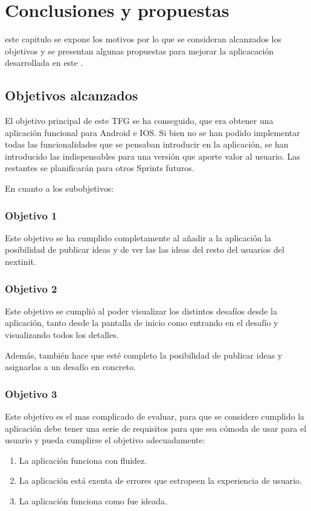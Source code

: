 \chapter{Conclusiones y propuestas}
\label{chap:conclusiones}

 este capitulo se expone los motivos por lo que se consideran alcanzados los objetivos y se presentan algunas propuestas para mejorar la aplicacación desarrollada en este .

\section{Objetivos alcanzados}

El objetivo principal de este TFG se ha conseguido, que era obtener una aplicación funcional para
Android e IOS. Si bien no se han podido implementar todas las funcionalidades que se pensaban introducir 
en la aplicación, se han introducido las indispensables para una versión que aporte valor al usuario. Las
 restantes se planificarán para otros Sprints futuros.

En cuanto a los subobjetivos: 
\subsection{Objetivo 1}
Este objetivo se ha cumplido completamente al añadir a la aplicación la posibilidad
de publicar ideas y de ver las las ideas del resto del usuarios del nextinit.
\subsection{Objetivo 2}
Este objetivo se cumplió al poder visualizar los distintos desafíos desde la aplicación, 
tanto desde la pantalla de inicio como entrando en el desafío y visualizando todos los detalles. 

Además, también hace que esté completo la posibilidad de publicar ideas y asignarlas a un desafío
en concreto.
\subsection{Objetivo 3}
Este objetivo es el mas complicado de evaluar, para que se considere cumplido la aplicación debe tener 
una serie de requisitos para que sea cómoda de usar para el usuario y pueda cumplirse el objetivo
 adecuadamente:
\begin{enumerate}
	\item La aplicación funciona con fluidez.
	\item La aplicación está exenta de errores que estropeen la experiencia de usuario.
	\item La aplicación funciona como fue ideada.
\end{enumerate}

